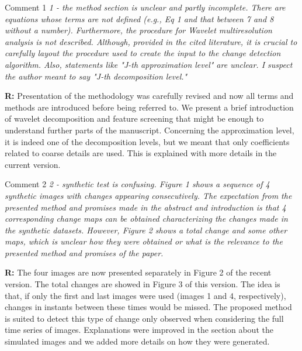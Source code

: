 \documentclass[11pt]{report}
\begin{document}
\medskip
\begin{mybox}{Comment 1}
\textit{1 - the method section is unclear and partly incomplete. There are equations whose terms are not defined (e.g., Eq 1 and
that between 7 and 8 without a number). Furthermore, the procedure for Wavelet multiresolution analysis is not
described. Although, provided in the cited literature, it is crucial to carefully layout the procedure used to create the input
to the change detection algorithm. Also, statements like "J-th approximation level" are unclear. I suspect the author
meant to say "J-th decomposition level."}


\medskip
\textbf{R:} Presentation of the methodology was carefully revised and now all terms and methods are introduced before being referred to. We present a brief introduction of wavelet decomposition and feature screening that might be enough to understand further parts of the manuscript. Concerning the approximation level, it is indeed one of the decomposition levels, but we meant that only coefficients related to coarse details are used. This is explained with more details in the current version.
\end{mybox}

\medskip


\begin{mybox}{Comment 2}
\textit{2 - synthetic test is confusing. Figure 1 shows a sequence of 4 synthetic images with changes appearing consecutively.
The expectation from the presented method and promises made in the abstract and introduction is that 4 corresponding
change maps can be obtained characterizing the changes made in the synthetic datasets. However, Figure 2 shows a
total change and some other maps, which is unclear how they were obtained or what is the relevance to the presented
method and promises of the paper.}

\medskip

\textbf{R:} The four images are now presented separately in Figure 2 of the recent version. The total changes are showed in Figure 3 of this version. The idea is that, if only the first and last images were used (images 1 and 4, respectively), changes in instants between these times would be missed. The proposed method is suited to detect this type of change only observed when considering the full time series of images. Explanations were improved in the section about the simulated images and we added more details on how they were generated.
\end{mybox}
\end{document}
